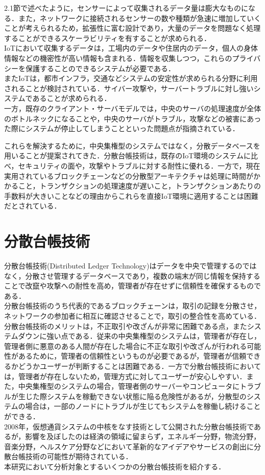 \documentclass[japanese, macos]{KU2}
\begin{document}
2.1節で述べたように，センサーによって収集されるデータ量は膨大なものになる．また，ネットワークに接続されるセンサーの数や種類が急速に増加していくことが考えられるため，拡張性に富む設計であり，大量のデータを問題なく処理することができるスケーラビリティを有することが求められる．\\
IoTにおいて収集するデータは，工場内のデータや住居内のデータ，個人の身体情報などの機密性が高い情報も含まれる．情報を収集しつつ，これらのプライバシーを保護することのできるシステムが必要である．\\
またIoTは，都市インフラ，交通などシステムの安定性が求められる分野に利用されることが検討されている．サイバー攻撃や，サーバートラブルに対し強いシステムであることが求められる．\\
一方，既存のクライアント・サーバモデルでは，中央のサーバの処理速度が全体のボトルネックになることや，中央のサーバがトラブル，攻撃などの被害にあった際にシステムが停止してしまうことといった問題点が指摘されている．

これらを解決するために，中央集権型のシステムではなく，分散データベースを用いることが提案されてきた．分散台帳技術は，既存のIoT環境のシステムに比べ，セキュリティの面や，攻撃やトラブルに対する耐性に優れる．一方で，現在実用されているブロックチェーンなどの分散型アーキテクチャは処理に時間がかかること，トランザクションの処理速度が遅いこと，トランザクションあたりの手数料が大きいことなどの理由からこれらを直接IoT環境に適用することは困難だとされている．\\


\section{分散台帳技術}

分散台帳技術(Distributed Ledger Technology)はデータを中央で管理するのではなく，分散させ管理するデータベースであり，複数の端末が同じ情報を保持することで改竄や攻撃への耐性を高め，管理者が存在せずに信頼性を確保するものである．\\
分散台帳技術のうち代表的であるブロックチェーンは，取引の記録を分散させ，ネットワークの参加者に相互に確認させることで，取引の整合性を高めている．\\
分散台帳技術のメリットは，不正取引や改ざんが非常に困難である点，またシステムダウンに強い点である．従来の中央集権型のシステムは，管理者が存在し，管理者側に悪意のある人間が存在した場合に不正な取引や改ざんが行われる可能性があるために，管理者の信頼性というものが必要であるが，管理者が信頼できるかどうかユーザーが判断することは困難である．一方で分散台帳技術においては，管理者が存在しないため，管理方式に対してユーザーが安心しやすい．また，中央集権型のシステムの場合，管理者側のサーバーやコンピュータにトラブルが生じた際システムを稼動できない状態に陥る危険性があるが，分散型のシステムの場合は，一部のノードにトラブルが生じてもシステムを稼働し続けることができる．\\
2008年，仮想通貨システムの中核をなす技術として公開された分散台帳技術であるが，影響を及ぼしたのは経済の領域に留まらず，エネルギー分野，物流分野，音楽分野，ヘルスケア分野などにおいて革新的なアイデアやサービスの創出に分散台帳技術の可能性が期待されている\cite{olnes2017blockchain}．\\
本研究において分析対象とするいくつかの分散台帳技術を紹介する．
\end{document}
